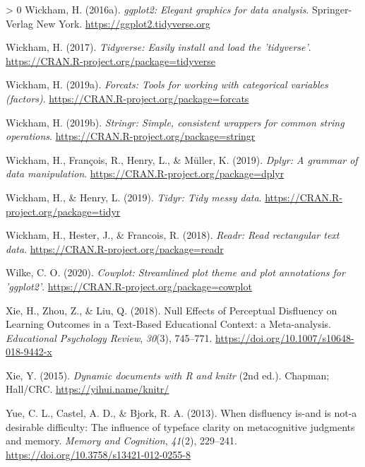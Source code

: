 \documentclass[
  english,
  jou]{apa7}
\newlength{\cslhangindent}
\newenvironment{CSLReferences}[3] %
 {%
  \setlength{\parindent}{0pt}
  \ifodd #1 \everypar{\setlength{\hangindent}{\cslhangindent}}\ignorespaces\fi
  \ifnum #2 > 0
  \setlength{\parskip}{#2\baselineskip}
  \fi
 }%
 {}
\begin{document}
\begin{CSLReferences}{1}{0}
\leavevmode\hypertarget{ref-Wickham2016}{}%
Wickham, H. (2016a). \emph{ggplot2: Elegant graphics for data analysis}. Springer-Verlag New York. \url{https://ggplot2.tidyverse.org}

\leavevmode\hypertarget{ref-R-tidyverse}{}%
Wickham, H. (2017). \emph{Tidyverse: Easily install and load the 'tidyverse'}. \url{https://CRAN.R-project.org/package=tidyverse}

\leavevmode\hypertarget{ref-R-forcats}{}%
Wickham, H. (2019a). \emph{Forcats: Tools for working with categorical variables (factors)}. \url{https://CRAN.R-project.org/package=forcats}

\leavevmode\hypertarget{ref-R-stringr}{}%
Wickham, H. (2019b). \emph{Stringr: Simple, consistent wrappers for common string operations}. \url{https://CRAN.R-project.org/package=stringr}

\leavevmode\hypertarget{ref-R-dplyr}{}%
Wickham, H., François, R., Henry, L., \& Müller, K. (2019). \emph{Dplyr: A grammar of data manipulation}. \url{https://CRAN.R-project.org/package=dplyr}

\leavevmode\hypertarget{ref-R-tidyr}{}%
Wickham, H., \& Henry, L. (2019). \emph{Tidyr: Tidy messy data}. \url{https://CRAN.R-project.org/package=tidyr}

\leavevmode\hypertarget{ref-R-readr}{}%
Wickham, H., Hester, J., \& Francois, R. (2018). \emph{Readr: Read rectangular text data}. \url{https://CRAN.R-project.org/package=readr}

\leavevmode\hypertarget{ref-R-cowplot}{}%
Wilke, C. O. (2020). \emph{Cowplot: Streamlined plot theme and plot annotations for 'ggplot2'}. \url{https://CRAN.R-project.org/package=cowplot}

\leavevmode\hypertarget{ref-Xie2018}{}%
Xie, H., Zhou, Z., \& Liu, Q. (2018). {Null Effects of Perceptual Disfluency on Learning Outcomes in a Text-Based Educational Context: a Meta-analysis}. \emph{Educational Psychology Review}, \emph{30}(3), 745--771. \url{https://doi.org/10.1007/s10648-018-9442-x}

\leavevmode\hypertarget{ref-R-knitr}{}%
Xie, Y. (2015). \emph{Dynamic documents with {R} and knitr} (2nd ed.). Chapman; Hall/CRC. \url{https://yihui.name/knitr/}

\leavevmode\hypertarget{ref-Yue2013}{}%
Yue, C. L., Castel, A. D., \& Bjork, R. A. (2013). {When disfluency is-and is not-a desirable difficulty: The influence of typeface clarity on metacognitive judgments and memory}. \emph{Memory and Cognition}, \emph{41}(2), 229--241. \url{https://doi.org/10.3758/s13421-012-0255-8}

\end{CSLReferences}

\endgroup
\end{document}
